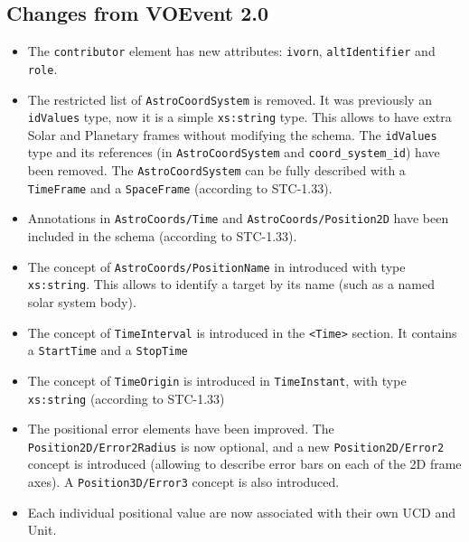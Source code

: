 \documentclass[11pt,a4paper]{ivoa}
\begin{document}
\subsection{Changes from VOEvent 2.0}
\label{appendix:last-changes}
\begin{itemize}
\item The {\tt contributor} element has new attributes: {\tt ivorn}, {\tt altIdentifier} and {\tt role}. 
\item The restricted list of {\tt AstroCoordSystem} is removed. It was previously an {\tt idValues} type, now it is a simple {\tt xs:string} type. This allows to have extra Solar and Planetary frames without modifying the schema. The {\tt idValues} type and its references (in {\tt AstroCoordSystem} and {\tt coord\_system\_id}) have been removed. The {\tt AstroCoordSystem} can be fully described with a {\tt TimeFrame} and a {\tt SpaceFrame}  (according to STC-1.33).
\item Annotations in {\tt AstroCoords/Time} and {\tt AstroCoords/Position2D} have been included in the schema (according to STC-1.33).
\item The concept of {\tt AstroCoords/PositionName} in introduced with type {\tt xs:string}. This allows to identify a target by its name (such as a named solar system body). 
\item The concept of {\tt TimeInterval} is introduced in the {\tt <Time>} section. It contains a {\tt StartTime} and a {\tt StopTime}
\item The concept of {\tt TimeOrigin} is introduced in {\tt TimeInstant}, with type {\tt xs:string} (according to STC-1.33)
\item The positional error elements have been improved. The {\tt Position2D/Error2Radius} is now optional, and a new {\tt Position2D/Error2} concept is introduced (allowing to describe error bars on each of the 2D frame axes). A {\tt Position3D/Error3} concept is also introduced.
\item Each individual positional value are now associated with their own UCD and Unit. 
\end{itemize}
\end{document}
